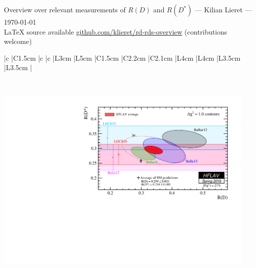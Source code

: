 


    \thispagestyle{empty}
    \begin{center}\Large
        Overview over relevant measurements of $R(D)$ and $R(D^*)$
        --- Kilian Lieret
        --- \today \\
        \large
        \LaTeX{} source available \url{github.com/klieret/rd-rds-overview} (contributions welcome)
    \end{center}
    
    \begin{center}
        \begin{tabular}{
                |c %
                |C{1.5cm} %
                |c %
                |c %
                |L{3cm} %
                |L{5cm} %
                |C{1.5cm} %
                |C{2.2cm} %
                |C{2.1cm} %
                |L{4cm} %
                |L{4cm} %
                |L{3.5cm} %
                |L{3.5cm} %
                |
                }
            \hline\hline
            
            \\\hline\hline
        \end{tabular}
    \end{center}
    
    \vspace{0.4cm}
    \includegraphics[height=9cm]{fig/hflav.pdf}
    

